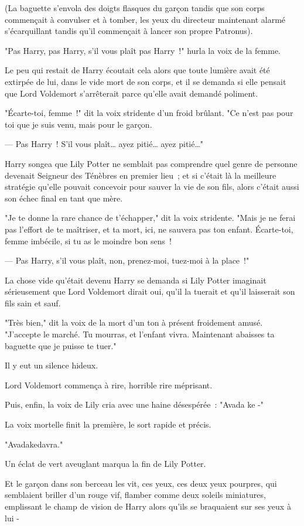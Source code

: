 (La baguette s'envola des doigts flasques du garçon tandis que son corps commençait à convulser et à tomber, les yeux du directeur maintenant alarmé s'écarquillant tandis qu'il commençait à lancer son propre Patronus).
\begin{em}

"Pas Harry, pas Harry, s'il vous plaît pas Harry~!" hurla la voix de la femme.

Le peu qui restait de Harry écoutait cela alors que toute lumière avait été extirpée de lui, dans le vide mort de son corps, et il se demanda si elle pensait que Lord Voldemort s'arrêterait parce qu'elle avait demandé poliment.

"Écarte-toi, femme~!" dit la voix stridente d'un froid brûlant. "Ce n'est pas pour toi que je suis venu, mais pour le garçon.

--- Pas Harry~! S'il vous plaît… ayez pitié… ayez pitié…"

Harry songea que Lily Potter ne semblait pas comprendre quel genre de personne devenait Seigneur des Ténèbres en premier lieu~; et si c'était là la meilleure stratégie qu'elle pouvait concevoir pour sauver la vie de son fils, alors c'était aussi son échec final en tant que mère.

"Je te donne la rare chance de t'échapper," dit la voix stridente. "Mais je ne ferai pas l'effort de te maîtriser, et ta mort, ici, ne sauvera pas ton enfant. Écarte-toi, femme imbécile, si tu as le moindre bon sens~!

--- Pas Harry, s'il vous plaît, non, prenez-moi, tuez-moi à la place~!"

La chose vide qu'était devenu Harry se demanda si Lily Potter imaginait sérieusement que Lord Voldemort dirait oui, qu'il la tuerait et qu'il laisserait son fils sain et sauf.

"Très bien," dit la voix de la mort d'un ton à présent froidement amusé. "J'accepte le marché. Tu mourras, et l'enfant vivra. Maintenant abaisses ta baguette que je puisse te tuer."

Il y eut un silence hideux.

Lord Voldemort commença à rire, horrible rire méprisant.

Puis, enfin, la voix de Lily cria avec une haine désespérée~: "Avada ke -"

La voix mortelle finit la première, le sort rapide et précis.

"Avadakedavra."

Un éclat de vert aveuglant marqua la fin de Lily Potter.

Et le garçon dans son berceau les vit, ces yeux, ces deux yeux pourpres, qui semblaient briller d'un rouge vif, flamber comme deux soleils miniatures, emplissant le champ de vision de Harry alors qu'ils se braquaient sur ses yeux à lui -

\end{em}

